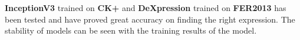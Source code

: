 \documentclass[11pt]{article}
\begin{document}
	\textbf{InceptionV3} trained on \textbf{CK+} and \textbf{DeXpression} trained on \textbf{FER2013} has been tested and have proved great accuracy on finding the right expression. The stability of models can be seen with the training results of the model. 
	
	
	\newpage
	
 

\end{document}
